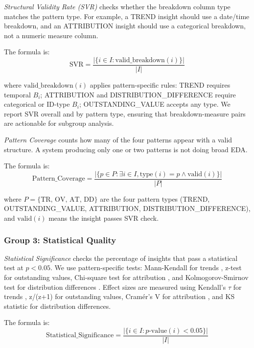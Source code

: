 \documentclass[conference]{IEEEtran}
\begin{document}
\textit{Structural Validity Rate (SVR)} checks whether the breakdown column type matches the pattern type. For example, a TREND insight should use a date/time breakdown, and an ATTRIBUTION insight should use a categorical breakdown, not a numeric measure column.

The formula is:
\begin{equation}
\text{SVR} = \frac{|\{i \in I : \text{valid\_breakdown}(i)\}|}{|I|}
\end{equation}

where $\text{valid\_breakdown}(i)$ applies pattern-specific rules: TREND requires temporal $B_i$; ATTRIBUTION and DISTRIBUTION\_DIFFERENCE require categorical or ID-type $B_i$; OUTSTANDING\_VALUE accepts any type. We report SVR overall and by pattern type, ensuring that breakdown-measure pairs are actionable for subgroup analysis.

\textit{Pattern Coverage} counts how many of the four patterns appear with a valid structure. A system producing only one or two patterns is not doing broad EDA.

The formula is:
\begin{equation}
\text{Pattern\_Coverage} = \frac{|\{p \in P : \exists i \in I, \text{type}(i) = p \land \text{valid}(i)\}|}{|P|}
\end{equation}

where $P = \{\text{TR, OV, AT, DD}\}$ are the four pattern types (TREND, OUTSTANDING\_VALUE, ATTRIBUTION, DISTRIBUTION\_DIFFERENCE), and $\text{valid}(i)$ means the insight passes SVR check.

\subsubsection{Group 3: Statistical Quality}

\textit{Statistical Significance} checks the percentage of insights that pass a statistical test at $p < 0.05$. We use pattern-specific tests: Mann-Kendall for trends \cite{mann}, z-test for outstanding values, Chi-square test for attribution \cite{mchugh}, and Kolmogorov-Smirnov test for distribution differences \cite{kolmogorov}. Effect sizes are measured using Kendall's $\tau$ for trends \cite{kendall}, z/(z+1) for outstanding values, Cramér's V for attribution \cite{cramer}, and KS statistic for distribution differences.

The formula is:
\begin{equation}
\text{Statistical\_Significance} = \frac{|\{i \in I : p\text{-value}(i) < 0.05\}|}{|I|}
\end{equation}
\end{document}
